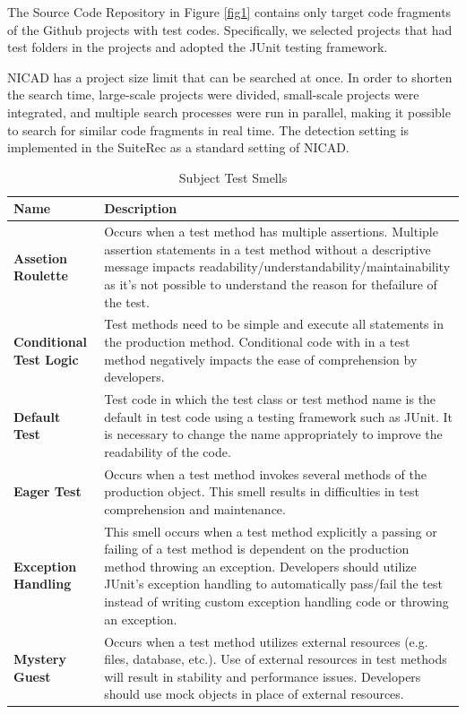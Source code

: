 \documentclass[conference]{IEEEtran}
\begin{document}
The Source Code Repository in Figure \ref{fig1} contains only target code fragments of the Github projects with test codes. Specifically, we selected projects that had  test folders in the projects and adopted the JUnit testing framework. 

NICAD has a project size limit that can be searched at once. In order to shorten the search time, large-scale projects were divided, small-scale projects were integrated, and multiple search processes were run in parallel, making it possible to search for similar code fragments in real time. The detection setting is implemented in the SuiteRec as a standard setting of NICAD.

\begin{table}[t]
\caption{Subject Test Smells}
\begin{tabular}{|l|p{14.5cm}|}
\hline
\textbf{Name}                   & \textbf{Description}                                                                                                       \\ \hline
\textbf{Assetion Roulette}        & Occurs when a test method has multiple assertions. Multiple assertion statements in a test method without a descriptive message  impacts readability/understandability/maintainability  as  it’s  not  possible  to  understand  the  reason  for  thefailure of the test.  \\ \hline
\textbf{Conditional Test Logic} & Test methods need to be simple and execute all statements in the production method. Conditional code with in a test method negatively impacts the ease of comprehension by developers.\\ \hline
\textbf{Default Test}            & Test code in which the test class or test method name is the default in test code using a testing framework such as JUnit. It is necessary to change the name appropriately to improve the readability of the code.                                                                                                      \\ \hline
\textbf{Eager Test }             & Occurs when a test method invokes several methods of the production object. This smell results in difficulties in test comprehension and maintenance. \\ \hline
\textbf{Exception Handling}      & This smell occurs when a test method explicitly a passing or failing of a test method is dependent on the production method throwing an exception. Developers should utilize JUnit's exception handling to automatically pass/fail the test instead of writing custom exception handling code or throwing an exception. \\ \hline
\textbf{Mystery Guest}          & Occurs when a test method utilizes external resources (e.g. files, database, etc.). Use of external resources in test methods will result in stability and performance issues. Developers should use mock objects in place of external resources. \\ \hline
\end{tabular}
\end{table}
\end{document}

